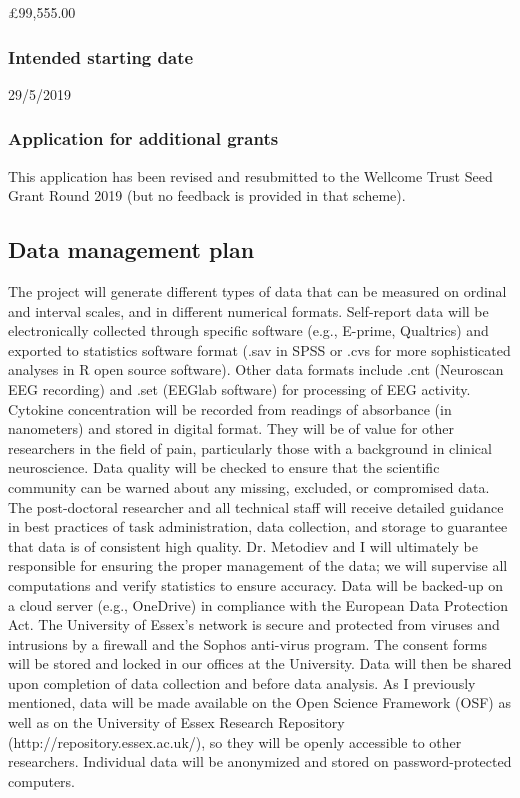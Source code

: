 \documentclass[twocolumn,  rga,issue, numeric]{jote-new-article}
\begin{document}
£99,555.00


\subsubsection{Intended starting date}


29/5/2019


\subsubsection{Application for additional grants}


This application has been revised and resubmitted to the Wellcome Trust
Seed Grant Round 2019 (but no feedback is provided in that scheme).


\subsection{Data management plan}


The project will generate different types of data that can be measured
on ordinal and interval scales, and in different numerical formats.
Self-report data will be electronically collected through specific
software (e.g., E-prime, Qualtrics) and exported to statistics software
format (.sav in SPSS or .cvs for more sophisticated analyses in R open
source software). Other data formats include .cnt (Neuroscan EEG
recording) and .set (EEGlab software) for processing of EEG activity.
Cytokine concentration will be recorded from readings of absorbance (in
nanometers) and stored in digital format. They will be of value for
other researchers in the field of pain, particularly those with a
background in clinical neuroscience. Data quality will be checked to
ensure that the scientific community can be warned about any missing,
excluded, or compromised data. The post-doctoral researcher and all
technical staff will receive detailed guidance in best practices of task
administration, data collection, and storage to guarantee that data is
of consistent high quality. Dr. Metodiev and I will ultimately be
responsible for ensuring the proper management of the data; we will
supervise all computations and verify statistics to ensure accuracy.
Data will be backed-up on a cloud server (e.g., OneDrive) in compliance
with the European Data Protection Act. The University of Essex's network
is secure and protected from viruses and intrusions by a firewall and
the Sophos anti-virus program. The consent forms will be stored and
locked in our offices at the University. Data will then be shared upon
completion of data collection and before data analysis. As I previously
mentioned, data will be made available on the Open Science Framework
(OSF) as well as on the University of Essex Research Repository
(http://repository.essex.ac.uk/), so they will be openly accessible to
other researchers. Individual data will be anonymized and stored on
password-protected computers.
\end{document}
